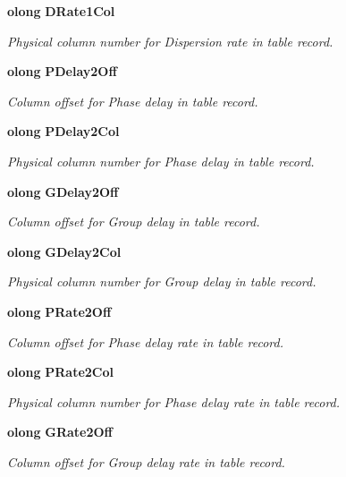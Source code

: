 \begin{CompactItemize}
{\bf olong} {\bf DRate1Col}
\begin{CompactList}\small\item\em Physical column number for Dispersion rate in table record. \item\end{CompactList}\item 
{\bf olong} {\bf PDelay2Off}
\begin{CompactList}\small\item\em Column offset for Phase delay in table record. \item\end{CompactList}\item 
{\bf olong} {\bf PDelay2Col}
\begin{CompactList}\small\item\em Physical column number for Phase delay in table record. \item\end{CompactList}\item 
{\bf olong} {\bf GDelay2Off}
\begin{CompactList}\small\item\em Column offset for Group delay in table record. \item\end{CompactList}\item 
{\bf olong} {\bf GDelay2Col}
\begin{CompactList}\small\item\em Physical column number for Group delay in table record. \item\end{CompactList}\item 
{\bf olong} {\bf PRate2Off}
\begin{CompactList}\small\item\em Column offset for Phase delay rate in table record. \item\end{CompactList}\item 
{\bf olong} {\bf PRate2Col}
\begin{CompactList}\small\item\em Physical column number for Phase delay rate in table record. \item\end{CompactList}\item 
{\bf olong} {\bf GRate2Off}
\begin{CompactList}\small\item\em Column offset for Group delay rate in table record. \item\end{CompactList}\item 

\end{CompactItemize}
